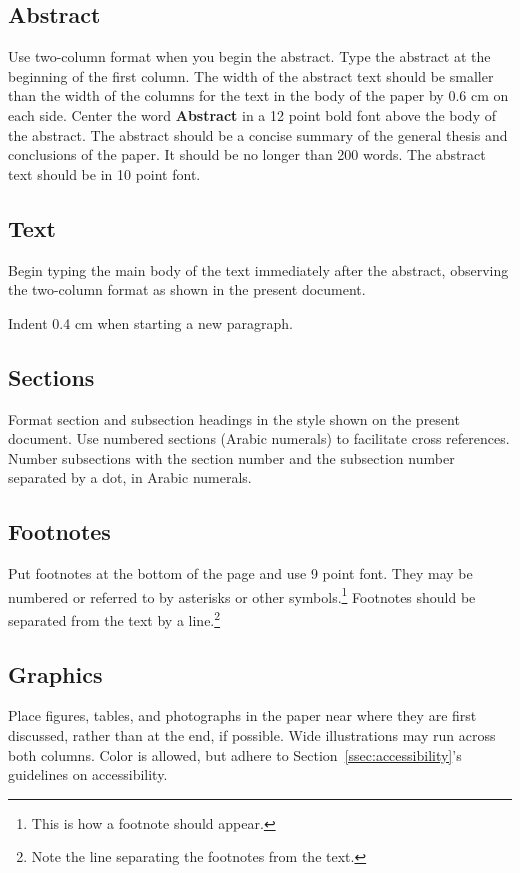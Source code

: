 \documentclass[11pt,a4paper]{article}
\begin{document}
\subsection{Abstract}
Use two-column format when you begin the abstract.
Type the abstract at the beginning of the first column.
The width of the abstract text should be smaller than the
width of the columns for the text in the body of the paper by 0.6 cm on each side.
Center the word \textbf{Abstract} in a 12 point bold font above the body of the abstract.
The abstract should be a concise summary of the general thesis and conclusions of the paper.
It should be no longer than 200 words.
The abstract text should be in 10 point font.

\subsection{Text}
Begin typing the main body of the text immediately after the abstract, observing the two-column format as shown in the present document.

Indent 0.4 cm when starting a new paragraph.

\subsection{Sections}

Format section and subsection headings in the style shown on the present document.
Use numbered sections (Arabic numerals) to facilitate cross references.
Number subsections with the section number and the subsection number separated by a dot, in Arabic numerals.

\subsection{Footnotes}
Put footnotes at the bottom of the page and use 9 point font.
They may be numbered or referred to by asterisks or other symbols.\footnote{This is how a footnote should appear.}
Footnotes should be separated from the text by a line.\footnote{Note the line separating the footnotes from the text.}

\subsection{Graphics}

Place figures, tables, and photographs in the paper near where they are first discussed, rather than at the end, if possible.
Wide illustrations may run across both columns.
Color is allowed, but adhere to Section~\ref{ssec:accessibility}'s guidelines on accessibility.
\end{document}
